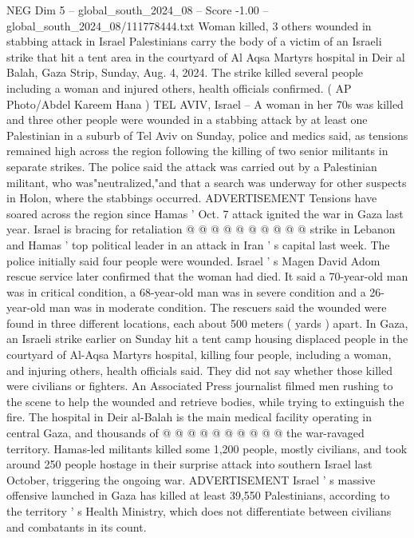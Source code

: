 \begin{textsample}{NEG Dim 5 – global\_south\_2024\_08 – Score -1.00 – global\_south\_2024\_08/111778444.txt}  \label{ex:f5_neg_170}
Woman killed, 3 others wounded in stabbing attack in Israel Palestinians carry the body of a victim of an Israeli strike that hit a tent area in the courtyard of Al Aqsa Martyrs hospital in Deir al Balah, Gaza Strip, Sunday, Aug. 4, 2024.
The strike killed several people including a woman and injured others, health officials confirmed. ( AP Photo/Abdel Kareem Hana ) TEL AVIV, Israel -- A woman in her 70s was killed and three other people were wounded in a stabbing attack by at least one Palestinian in a suburb of Tel Aviv on Sunday, police and medics said, as tensions remained high across the region following the killing of two senior militants in separate strikes.
The police said the attack was carried out by a Palestinian militant, who was"neutralized,"and that a search was underway for other suspects in Holon, where the stabbings occurred.
ADVERTISEMENT Tensions have soared across the region since Hamas ' Oct. 7 attack ignited the war in Gaza last year.
Israel is bracing for retaliation @ @ @ @ @ @ @ @ @ @ strike in Lebanon and Hamas ' top political leader in an attack in Iran ' s capital last week.
The police initially said four people were wounded.
Israel ' s Magen David Adom rescue service later confirmed that the woman had died.
It said a 70-year-old man was in critical condition, a 68-year-old man was in severe condition and a 26-year-old man was in moderate condition.
The rescuers said the wounded were found in three different locations, each about 500 meters ( yards ) apart.
In Gaza, an Israeli strike earlier on Sunday hit a tent camp housing displaced people in the courtyard of Al-Aqsa Martyrs hospital, killing four people, including a woman, and injuring others, health officials said.
They did not say whether those killed were civilians or fighters.
An Associated Press journalist filmed men rushing to the scene to help the wounded and retrieve bodies, while trying to extinguish the fire.
The hospital in Deir al-Balah is the main medical facility operating in central Gaza, and thousands of @ @ @ @ @ @ @ @ @ @ the war-ravaged territory.
Hamas-led militants killed some 1,200 people, mostly civilians, and took around 250 people hostage in their surprise attack into southern Israel last October, triggering the ongoing war.
ADVERTISEMENT Israel ' s massive offensive launched in Gaza has killed at least 39,550 Palestinians, according to the territory ' s Health Ministry, which does not differentiate between civilians and combatants in its count.

\end{textsample}
